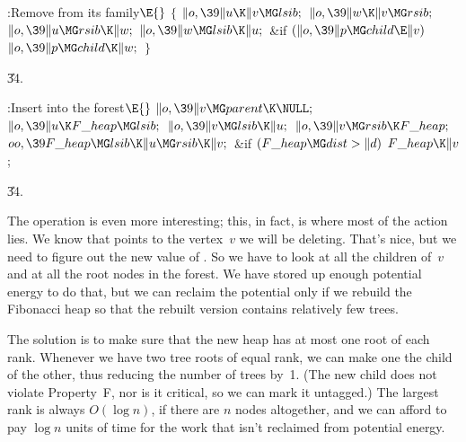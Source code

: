 \B{}:Remove  from its family\X${}\E{}$\6
${}\{{}$\1\6
${}\|o,\39\|u\K\|v\MG\\{lsib};{}$\6
${}\|o,\39\|w\K\|v\MG\\{rsib};{}$\6
${}\|o,\39\|u\MG\\{rsib}\K\|w;{}$\6
${}\|o,\39\|w\MG\\{lsib}\K\|u;{}$\6
\&{if} ${}(\|o,\39\|p\MG\\{child}\E\|v){}$\1\5
${}\|o,\39\|p\MG\\{child}\K\|w;{}$\2\6
\4${}\}{}$\2\par
\U34.\fi

\B{}:Insert  into the forest\X${}\E{}$\6
$\|o,\39\|v\MG\\{parent}\K\NULL;{}$\6
${}\|o,\39\|u\K\\{F\_heap}\MG\\{lsib};{}$\6
${}\|o,\39\|v\MG\\{lsib}\K\|u;{}$\6
${}\|o,\39\|v\MG\\{rsib}\K\\{F\_heap};{}$\6
${}\\{oo},\39\\{F\_heap}\MG\\{lsib}\K\|u\MG\\{rsib}\K\|v;{}$\6
\&{if} ${}(\\{F\_heap}\MG\\{dist}>\|d){}$\1\5
${}\\{F\_heap}\K\|v{}$;\2%
\par
\U34.\fi

The  operation is even more interesting; this, in fact,
is where most of the action lies. We know that  points to the
vertex~$v$ we will be deleting. That's nice, but we need to figure out
the new value of . So we have to look at all the children
of~$v$
and at all the root nodes in the forest. We have stored up enough
potential energy to do that, but we can reclaim the potential only if
we rebuild the Fibonacci heap so that the rebuilt version contains
relatively few trees.

The solution is to make sure that the new heap has at most one root
of each rank. Whenever we have two tree roots of equal rank, we can
make one the child of the other, thus reducing the number of
trees by~1. (The new child does not violate Property~F, nor is it
critical, so we can mark it untagged.) The largest rank is always
$O(\log n)$, if there are $n$ nodes altogether, and we can afford to
pay $\log n$ units of time for the work that isn't reclaimed from
potential energy.


